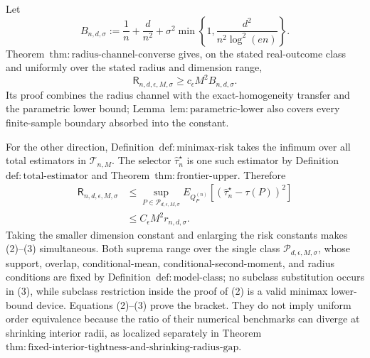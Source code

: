 Let
\[
 B_{n,d,\sigma}:=\frac1n+\frac d{n^2}
 +\sigma^2\min\left\{1,\frac{d^2}{n^2\log^2(en)}\right\}.
\tag{1}
\]
Theorem~\(\mathrm{thm:radius\text{-}channel\text{-}converse}\) gives, on the stated real-outcome class and uniformly over the stated radius and dimension range,
\[
 \mathsf R_{n,d,\epsilon,M,\sigma}
 \ge c_\epsilon M^2 B_{n,d,\sigma}.
\tag{2}
\]
Its proof combines the radius channel with the exact-homogeneity transfer and the parametric lower bound; Lemma~\(\mathrm{lem:parametric\text{-}lower}\) also covers every finite-sample boundary absorbed into the constant.

For the other direction, Definition~\(\mathrm{def:minimax\text{-}risk}\) takes the infimum over all total estimators in \(\mathcal T_{n,M}\).  The selector \(\widehat\tau_n^\star\) is one such estimator by Definition~\(\mathrm{def:total\text{-}estimator}\) and Theorem~\(\mathrm{thm:frontier\text{-}upper}\).  Therefore
\[
\begin{aligned}
 \mathsf R_{n,d,\epsilon,M,\sigma}
 &\le
 \sup_{P\in\mathcal P_{d,\epsilon,M,\sigma}}
 E_{Q_P^{(n)}}[(\widehat\tau_n^\star-\tau(P))^2]\\
 &\le C_\epsilon M^2r_{n,d,\sigma}.
\end{aligned}
\tag{3}
\]
Taking the smaller dimension constant and enlarging the risk constants makes (2)--(3) simultaneous.  Both suprema range over the single class \(\mathcal P_{d,\epsilon,M,\sigma}\), whose support, overlap, conditional-mean, conditional-second-moment, and radius conditions are fixed by Definition~\(\mathrm{def:model\text{-}class}\); no subclass substitution occurs in (3), while subclass restriction inside the proof of (2) is a valid minimax lower-bound device.  Equations (2)--(3) prove the bracket.  They do not imply uniform order equivalence because the ratio of their numerical benchmarks can diverge at shrinking interior radii, as localized separately in Theorem~\(\mathrm{thm:fixed\text{-}interior\text{-}tightness\text{-}and\text{-}shrinking\text{-}radius\text{-}gap}\).